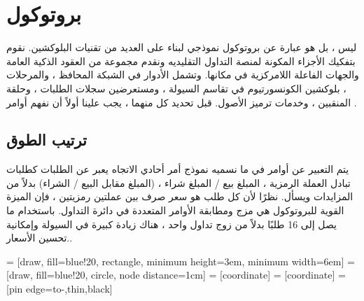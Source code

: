 \documentclass[12pt, a4paper, leqno]{report}
\makeatletter
\newenvironment{figurehere}
 {\def\@captype{figure}}
 {}
\theoremstyle{plain}
\theoremstyle{definition}
\makeatother
\begin{document}
\chapter{بروتوكول }
\begin{multicols}{2}
\begin{otherlanguage}{arabic}
 ليس  ، بل هو عبارة عن بروتوكول نموذجي لبناء  على العديد من تقنيات البلوكشين. نقوم بتفكيك الأجزاء المكونة لمنصة التداول التقليديه ونقدم مجموعة من العقود الذكية العامة والجهات الفاعلة اللامركزية في مكانها. وتشمل الأدوار في الشبكة المحافظ ، والمرحلات ، بلوكشين الكونسورتيوم في تقاسم السيولة ، ومستعرضين سجلات الطلبات ، وحلقة المنقبين ، وخدمات ترميز الأصول. قبل تحديد كل منهما ، يجب علينا أولاً أن نفهم أوامر .
\end{otherlanguage}
\section{ترتيب الطوق}
\begin{otherlanguage}{arabic}
يتم التعبير عن أوامر  في ما نسميه نموذج أمر أحادي الاتجاه  يعبر عن الطلبات كطلبات تبادل العملة الرمزية ، المبلغ بيع / المبلغ شراء ، (المبلغ  مقابل البيع / الشراء) بدلاً من المزايدات ويسأل. نظرًا لأن كل طلب هو سعر صرف بين عملتين رمزيتين ، فإن الميزة القوية للبروتوكول هي مزج ومطابقة الأوامر المتعددة في دائرة  التداول. باستخدام ما يصل إلى 16 طلبًا بدلاً من زوج تداول واحد ، هناك زيادة كبيرة في السيولة وإمكانية تحسين الأسعار..

\begin{center}
\begin{figurehere}
\centering
{} = [draw, fill=blue!20, rectangle, 
    minimum height=3em, minimum width=6em]
 = [draw, fill=blue!20, circle, node distance=1cm]
 = [coordinate]
 = [coordinate]
 = [pin edge={to-,thin,black}]

\end{figurehere}
\end{center}
\end{otherlanguage}
\end{multicols}
\end{document}
